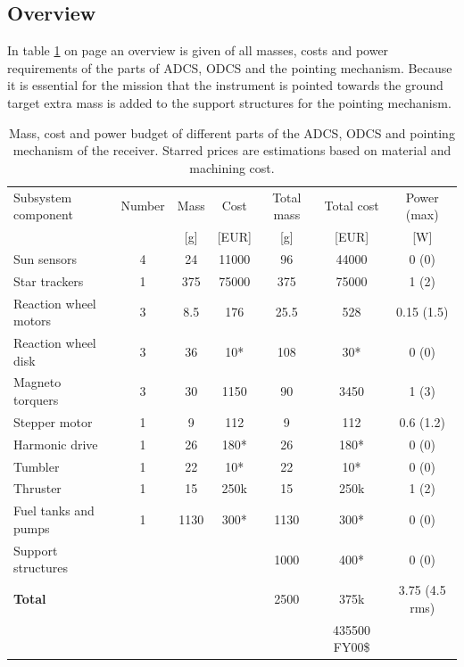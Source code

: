 \subsection{Overview}
\label{ss:recDDoverview}
In table \ref{tab:adcspointbudgetreceiver} on page \pageref{tab:adcspointbudgetreceiver} an overview is given of all masses, costs and power requirements of the parts of \ac{ADCS}, \ac{ODCS} and the pointing mechanism. Because it is essential for the mission that the instrument is pointed towards the ground target extra mass is added to the support structures for the pointing mechanism.
\begin{table}[h]
\begin{tabular}{l | c | c c | c c | c }\hline
Subsystem component    & Number & Mass & Cost & Total mass & Total cost & Power (max)\\ 
                       &   & [g] & [EUR]& [g]  &[EUR] & [W]         \\ \hline \hline
Sun sensors            & 4 & 24  & 11000& 96   & 44000&  0 (0)      \\
Star trackers          & 1 & 375 & 75000& 375  & 75000&  1 (2)      \\ \hline
Reaction wheel motors  & 3 & 8.5 & 176  & 25.5 & 528  &  0.15 (1.5) \\
Reaction wheel disk    & 3 & 36  & 10*  & 108  & 30*  &  0 (0)      \\
Magneto torquers       & 3 & 30  & 1150 & 90   & 3450 &  1 (3)      \\ \hline
Stepper motor          & 1 & 9   & 112  & 9    & 112  &  0.6 (1.2)  \\
Harmonic drive         & 1 & 26  & 180* & 26   & 180* &  0 (0)      \\ 
Tumbler                & 1 & 22  & 10*  & 22   & 10*  &  0 (0)      \\ \hline
Thruster			   & 1 & 15  & 250k & 15   & 250k &  1 (2)      \\
Fuel tanks and pumps   & 1 & 1130 & 300*& 1130  & 300*  & 0 (0)      \\ \hline
Support structures     &	&	 &	    & 1000  & 400* & 0 (0) \\ \hline
\textbf{Total} & & &                             & 2500  & 375k & 3.75 (4.5 rms) \\
&&&&& 435500 FY00\$ &\\
\hline
\end{tabular}
\caption[Mass, cost and power budget of AODCS and pointing mechanism receiver]{Mass, cost and power budget of different parts of the \ac{ADCS}, \ac{ODCS} and pointing mechanism of the receiver. Starred prices are estimations based on material and machining cost.}
\label{tab:adcspointbudgetreceiver}
\end{table}